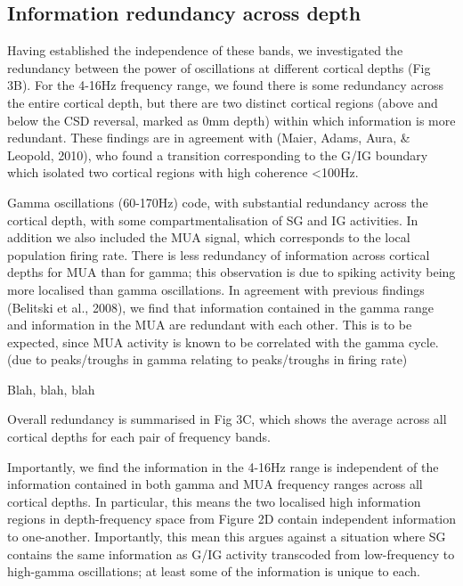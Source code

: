 \documentclass{article}
\begin{document}
\subsection{Information redundancy across depth}
Having established the independence of these bands, we investigated the redundancy between the power of oscillations at different cortical depths (Fig 3B). For the 4-16Hz frequency range, we found there is some redundancy across the entire cortical depth, but there are two distinct cortical regions (above and below the CSD reversal, marked as 0mm depth) within which information is more redundant. These findings are in agreement with (Maier, Adams, Aura, \& Leopold, 2010), who found a transition corresponding to the G/IG boundary which isolated two cortical regions with high coherence {\textless}100Hz.

Gamma oscillations (60-170Hz) code, with substantial redundancy across the cortical depth, with some compartmentalisation of SG and IG activities. In addition we also included the MUA signal, which corresponds to the local population firing rate. There is less redundancy of information across cortical depths for MUA than for gamma; this observation is due to spiking activity being more localised than gamma oscillations. In agreement with previous findings (Belitski et al., 2008), we find that information contained in the gamma range and information in the MUA are redundant with each other. This is to be expected, since MUA activity is known to be correlated with the gamma cycle.(due to peaks/troughs in gamma relating to peaks/troughs in firing rate)

Blah, blah, blah

Overall redundancy is summarised in Fig 3C, which shows the average across all cortical depths for each pair of frequency bands.

Importantly, we find the information in the 4-16Hz range is independent of the information contained in both gamma and MUA frequency ranges across all cortical depths. In particular, this means the two localised high information regions in depth-frequency space from Figure 2D contain independent information to one-another. Importantly, this mean this argues against a situation where SG contains the same information as G/IG activity transcoded from low-frequency to high-gamma oscillations; at least some of the information is unique to each.
\end{document}
